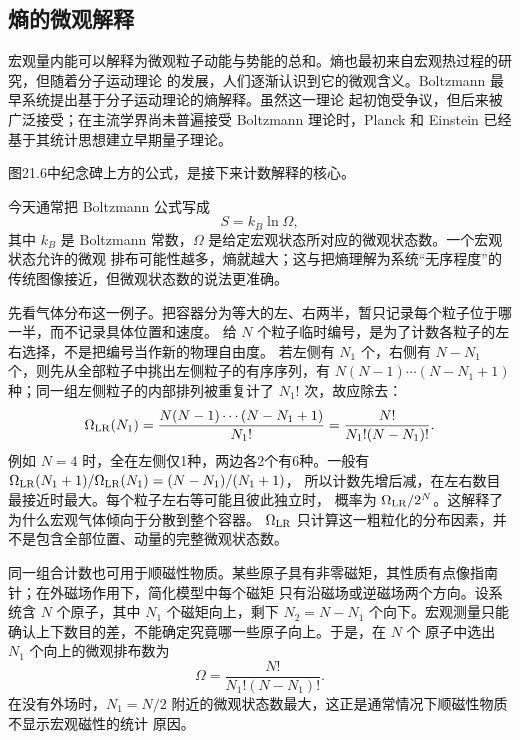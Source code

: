 \subsection*{熵的微观解释}

宏观量内能可以解释为微观粒子动能与势能的总和。熵也最初来自宏观热过程的研究，但随着分子运动理论
的发展，人们逐渐认识到它的微观含义。Boltzmann 最早系统提出基于分子运动理论的熵解释。虽然这一理论
起初饱受争议，但后来被广泛接受；在主流学界尚未普遍接受 Boltzmann 理论时，Planck 和 Einstein 已经
基于其统计思想建立早期量子理论。

\boltzmannMemorialFigure
{}
图21.6中纪念碑上方的公式，是接下来计数解释的核心。

今天通常把 Boltzmann 公式写成
\begin{equation}
  \boxed{S=k_B\ln\Omega},
\end{equation}
其中 $k_B$ 是 Boltzmann 常数，$\Omega$ 是给定宏观状态所对应的微观状态数。一个宏观状态允许的微观
排布可能性越多，熵就越大；这与把熵理解为系统“无序程度”的传统图像接近，但微观状态数的说法更准确。

先看气体分布这一例子。把容器分为等大的左、右两半，暂只记录每个粒子位于哪一半，而不记录具体位置和速度。
给 $N$ 个粒子临时编号，是为了计数各粒子的左右选择，不是把编号当作新的物理自由度。
若左侧有 $N_1$ 个，右侧有 $N-N_1$ 个，则先从全部粒子中挑出左侧粒子的有序序列，有
$N(N-1)\cdots(N-N_1+1)$ 种；同一组左侧粒子的内部排列被重复计了 $N_1!$ 次，故应除去：
\[
 \Omega_{\rm LR}(N_1)=\frac{N(N-1)\cdots(N-N_1+1)}{N_1!}
 =\frac{N!}{N_1!(N-N_1)!}.
\]
例如 $N=4$ 时，全在左侧仅1种，两边各2个有6种。一般有
$\Omega_{\rm LR}(N_1+1)/\Omega_{\rm LR}(N_1)=(N-N_1)/(N_1+1)$，
所以计数先增后减，在左右数目最接近时最大。每个粒子左右等可能且彼此独立时，
概率为 $\Omega_{\rm LR}/2^N$。这解释了为什么宏观气体倾向于分散到整个容器。
$\Omega_{\rm LR}$ 只计算这一粗粒化的分布因素，并不是包含全部位置、动量的完整微观状态数。

同一组合计数也可用于顺磁性物质。某些原子具有非零磁矩，其性质有点像指南针；在外磁场作用下，简化模型中每个磁矩
只有沿磁场或逆磁场两个方向。设系统含 $N$ 个原子，其中 $N_1$ 个磁矩向上，剩下
$N_2=N-N_1$ 个向下。宏观测量只能确认上下数目的差，不能确定究竟哪一些原子向上。于是，在 $N$ 个
原子中选出 $N_1$ 个向上的微观排布数为
\begin{equation}
  \boxed{\Omega=\frac{N!}{N_1!(N-N_1)!}}.
\end{equation}
在没有外场时，$N_1=N/2$ 附近的微观状态数最大，这正是通常情况下顺磁性物质不显示宏观磁性的统计
原因。

